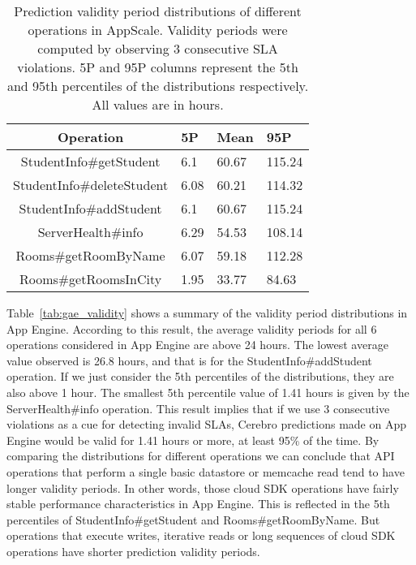 \begin{table}[htdp]
\caption{Prediction validity period distributions of different operations in AppScale. Validity periods were computed by observing 3 consecutive SLA violations. 5P and 95P columns represent the 5th and 95th percentiles of the
distributions respectively. All values are in hours.}
\begin{center}
\begin{tabular}{|c|p{1cm}|p{1cm}|p{1cm}|}
\hline
Operation & 5P & Mean & 95P \\ \hline
StudentInfo\#getStudent & 6.1 & 60.67 & 115.24 \\ \hline
StudentInfo\#deleteStudent & 6.08 & 60.21 & 114.32 \\ \hline
StudentInfo\#addStudent & 6.1 & 60.67 & 115.24 \\ \hline
ServerHealth\#info & 6.29 & 54.53 & 108.14 \\ \hline
Rooms\#getRoomByName & 6.07 & 59.18 & 112.28 \\ \hline
Rooms\#getRoomsInCity & 1.95 & 33.77 & 84.63 \\ \hline
\end{tabular}
\end{center}
\label{tab:as_validity}
\end{table}

Table~\ref{tab:gae_validity} shows a summary of the validity period distributions in App Engine. 
According to this result, the average validity periods for all 6 operations considered in App Engine are
above 24 hours. The lowest average value observed is 26.8 hours, and that is for the StudentInfo\#addStudent operation. If we
just consider the 5th percentiles of the distributions, they are also above 1 hour. The smallest 5th percentile value of 1.41 hours is 
given by the ServerHealth\#info operation. This result implies that if we use 3 consecutive violations as a cue for detecting invalid SLAs,
Cerebro predictions made on App Engine would be valid for 1.41 hours or more, at least 95\% of the time.
By comparing the distributions for different operations we can conclude that API operations that perform a single basic datastore or
memcache read tend to have longer validity periods. In other words, those cloud SDK operations have fairly stable performance
characteristics in App Engine. This is reflected in the 5th percentiles of StudentInfo\#getStudent and
Rooms\#getRoomByName. But operations that execute writes, iterative
reads or long sequences of cloud SDK operations have shorter prediction validity periods.

